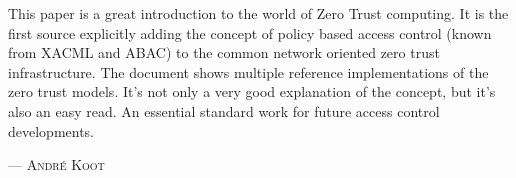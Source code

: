 This paper is a great introduction to the world of Zero Trust computing. It is the first source explicitly adding the concept of policy based access control (known from XACML and ABAC) to the common network oriented zero trust infrastructure. The document shows multiple reference implementations of the zero trust models.
	It's not only a very good explanation of the concept, but it's also an easy read. An essential standard work for future access control developments.
\setlength{\parindent}{0cm}\par\textsc{ --- André Koot }\par\vspace{12pt}\setlength{\parindent}{15pt}
